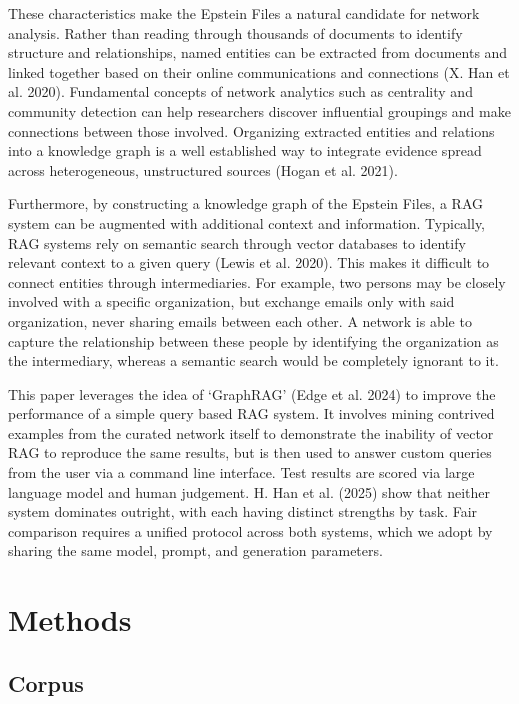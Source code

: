 \documentclass[
  letterpaper,
  DIV=11,
  numbers=noendperiod]{scrartcl}
\begin{document}
These characteristics make the Epstein Files a natural candidate for
network analysis. Rather than reading through thousands of documents to
identify structure and relationships, named entities can be extracted
from documents and linked together based on their online communications
and connections (X. Han et al. 2020). Fundamental concepts of network
analytics such as centrality and community detection can help
researchers discover influential groupings and make connections between
those involved. Organizing extracted entities and relations into a
knowledge graph is a well established way to integrate evidence spread
across heterogeneous, unstructured sources (Hogan et al. 2021).

Furthermore, by constructing a knowledge graph of the Epstein Files, a
RAG system can be augmented with additional context and information.
Typically, RAG systems rely on semantic search through vector databases
to identify relevant context to a given query (Lewis et al. 2020). This
makes it difficult to connect entities through intermediaries. For
example, two persons may be closely involved with a specific
organization, but exchange emails only with said organization, never
sharing emails between each other. A network is able to capture the
relationship between these people by identifying the organization as the
intermediary, whereas a semantic search would be completely ignorant to
it.

This paper leverages the idea of `GraphRAG' (Edge et al. 2024) to
improve the performance of a simple query based RAG system. It involves
mining contrived examples from the curated network itself to demonstrate
the inability of vector RAG to reproduce the same results, but is then
used to answer custom queries from the user via a command line
interface. Test results are scored via large language model and human
judgement. H. Han et al. (2025) show that neither system dominates
outright, with each having distinct strengths by task. Fair comparison
requires a unified protocol across both systems, which we adopt by
sharing the same model, prompt, and generation parameters.

\section{Methods}\label{methods}

\subsection{Corpus}\label{corpus}
\end{document}
